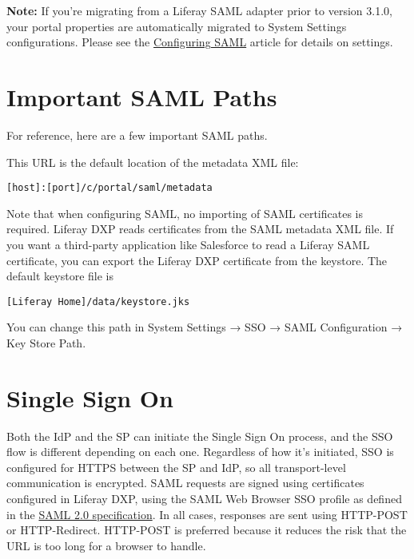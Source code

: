 \noindent\hrulefill

\textbf{Note:} If you're migrating from a Liferay SAML adapter prior to
version 3.1.0, your portal properties are automatically migrated to
System Settings configurations. Please see the
\href{/docs/7-2/deploy/-/knowledge_base/d/configuring-saml}{Configuring
SAML} article for details on settings.

\noindent\hrulefill

\section{Important SAML Paths}\label{important-saml-paths}

For reference, here are a few important SAML paths.

This URL is the default location of the metadata XML file:

\begin{verbatim}
[host]:[port]/c/portal/saml/metadata
\end{verbatim}

Note that when configuring SAML, no importing of SAML certificates is
required. Liferay DXP reads certificates from the SAML metadata XML
file. If you want a third-party application like Salesforce to read a
Liferay SAML certificate, you can export the Liferay DXP certificate
from the keystore. The default keystore file is

\begin{verbatim}
[Liferay Home]/data/keystore.jks 
\end{verbatim}

You can change this path in System Settings → SSO → SAML Configuration →
Key Store Path.

\section{Single Sign On}\label{single-sign-on}

Both the IdP and the SP can initiate the Single Sign On process, and the
SSO flow is different depending on each one. Regardless of how it's
initiated, SSO is configured for HTTPS between the SP and IdP, so all
transport-level communication is encrypted. SAML requests are signed
using certificates configured in Liferay DXP, using the SAML Web Browser
SSO profile as defined in the
\href{http://saml.xml.org/saml-specifications}{SAML 2.0 specification}.
In all cases, responses are sent using HTTP-POST or HTTP-Redirect.
HTTP-POST is preferred because it reduces the risk that the URL is too
long for a browser to handle.


